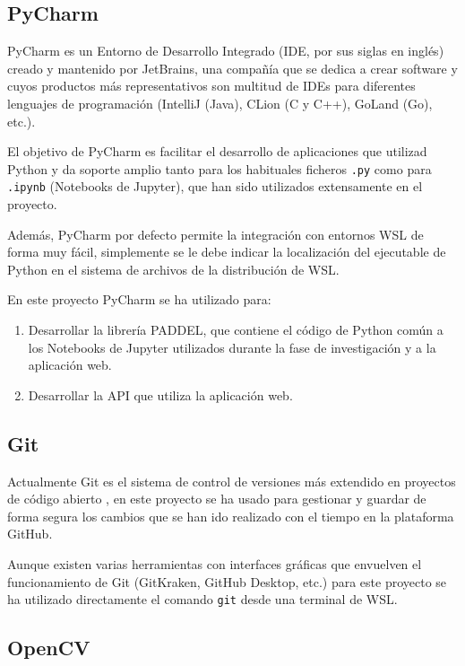 \subsection{PyCharm}

PyCharm es un Entorno de Desarrollo Integrado (IDE, por sus siglas en inglés)
creado y mantenido por JetBrains, una compañía que se dedica a crear software y
cuyos productos más representativos son multitud de IDEs para diferentes
lenguajes de programación (IntelliJ (Java), CLion (C y C++), GoLand (Go), etc.).

El objetivo de PyCharm es facilitar el desarrollo de aplicaciones que utilizad
Python y da soporte amplio tanto para los habituales ficheros \texttt{.py} como
para \texttt{.ipynb} (Notebooks de Jupyter), que han sido utilizados
extensamente en el proyecto.

Además, PyCharm por defecto permite la integración con entornos WSL de forma muy
fácil, simplemente se le debe indicar la localización del ejecutable de Python
en el sistema de archivos de la distribución de WSL.

En este proyecto PyCharm se ha utilizado para:

\begin{enumerate}
    \item Desarrollar la librería PADDEL, que contiene el código de Python común
          a los Notebooks de Jupyter utilizados durante la fase de investigación
          y a la aplicación web.
    \item Desarrollar la API que utiliza la aplicación web.
\end{enumerate}


\subsection{Git}

Actualmente Git es el sistema de control de versiones más extendido en proyectos
de código abierto \cite{OpenHubVCS}, en este proyecto se ha usado para gestionar
y guardar de forma segura los cambios que se han ido realizado con el tiempo en
la plataforma GitHub.

Aunque existen varias herramientas con interfaces gráficas que envuelven el
funcionamiento de Git (GitKraken, GitHub Desktop, etc.) para este proyecto se ha
utilizado directamente el comando \texttt{git} desde una terminal de WSL.


\subsection{OpenCV}

